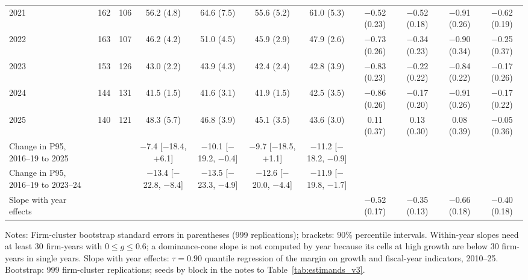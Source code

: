 \begin{table}[t]
{\begin{tabular}{lcccccccccc}
2021 & 162 & 106 & 56.2 (4.8) & 64.6 (7.5) & 55.6 (5.2) & 61.0 (5.3) & $-$0.52 (0.23) & $-$0.52 (0.18) & $-$0.91 (0.26) & $-$0.62 (0.19) \\
2022 & 163 & 107 & 46.2 (4.2) & 51.0 (4.5) & 45.9 (2.9) & 47.9 (2.6) & $-$0.73 (0.26) & $-$0.34 (0.23) & $-$0.90 (0.34) & $-$0.25 (0.37) \\
2023 & 153 & 126 & 43.0 (2.2) & 43.9 (4.3) & 42.4 (2.4) & 42.8 (3.9) & $-$0.83 (0.23) & $-$0.22 (0.22) & $-$0.84 (0.22) & $-$0.17 (0.26) \\
2024 & 144 & 131 & 41.5 (1.5) & 41.6 (3.1) & 41.9 (1.5) & 42.5 (3.5) & $-$0.86 (0.26) & $-$0.17 (0.20) & $-$0.91 (0.26) & $-$0.17 (0.22) \\
2025 & 140 & 121 & 48.3 (5.7) & 46.8 (3.9) & 45.1 (3.5) & 43.6 (3.0) & 0.11 (0.37) & 0.13 (0.30) & 0.08 (0.39) & $-$0.05 (0.36) \\
\addlinespace
Change in P95, 2016--19 to 2025 & & & $-$7.4 [$-$18.4, +6.1] & $-$10.1 [$-$19.2, $-$0.4] & $-$9.7 [$-$18.5, +1.1] & $-$11.2 [$-$18.2, $-$0.9] & & & & \\
Change in P95, 2016--19 to 2023--24 & & & $-$13.4 [$-$22.8, $-$8.4] & $-$13.5 [$-$23.3, $-$4.9] & $-$12.6 [$-$20.0, $-$4.4] & $-$11.9 [$-$19.8, $-$1.7] & & & & \\
Slope with year effects & & & & & & & $-$0.52 (0.17) & $-$0.35 (0.13) & $-$0.66 (0.18) & $-$0.40 (0.18) \\
\bottomrule\end{tabular}}
\par\vspace{2pt}\footnotesize\raggedright Notes: Firm-cluster bootstrap standard errors in parentheses (999 replications); brackets: 90\% percentile intervals. Within-year slopes need at least 30 firm-years with $0\leq g\leq0.6$; a dominance-cone slope is not computed by year because its cells at high growth are below 30 firm-years in single years. Slope with year effects: $\tau=0.90$ quantile regression of the margin on growth and fiscal-year indicators, 2010--25. Bootstrap: 999 firm-cluster replications; seeds by block in the notes to Table~\ref{tab:estimands_v3}.
\end{table}
